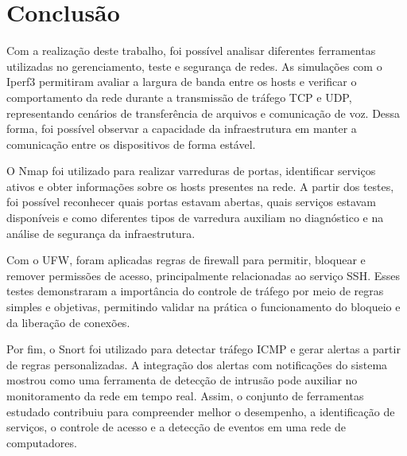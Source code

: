 \documentclass[10pt,twocolumn,letterpaper]{IEEEtran}
\begin{document}
\section{Conclusão}

Com a realização deste trabalho, foi possível analisar diferentes ferramentas utilizadas no gerenciamento, teste e segurança de redes. As simulações com o Iperf3 permitiram avaliar a largura de banda entre os hosts e verificar o comportamento da rede durante a transmissão de tráfego TCP e UDP, representando cenários de transferência de arquivos e comunicação de voz. Dessa forma, foi possível observar a capacidade da infraestrutura em manter a comunicação entre os dispositivos de forma estável.

O Nmap foi utilizado para realizar varreduras de portas, identificar serviços ativos e obter informações sobre os hosts presentes na rede. A partir dos testes, foi possível reconhecer quais portas estavam abertas, quais serviços estavam disponíveis e como diferentes tipos de varredura auxiliam no diagnóstico e na análise de segurança da infraestrutura.

Com o UFW, foram aplicadas regras de firewall para permitir, bloquear e remover permissões de acesso, principalmente relacionadas ao serviço SSH. Esses testes demonstraram a importância do controle de tráfego por meio de regras simples e objetivas, permitindo validar na prática o funcionamento do bloqueio e da liberação de conexões.

Por fim, o Snort foi utilizado para detectar tráfego ICMP e gerar alertas a partir de regras personalizadas. A integração dos alertas com notificações do sistema mostrou como uma ferramenta de detecção de intrusão pode auxiliar no monitoramento da rede em tempo real. Assim, o conjunto de ferramentas estudado contribuiu para compreender melhor o desempenho, a identificação de serviços, o controle de acesso e a detecção de eventos em uma rede de computadores.



{\small


}


\end{document}
